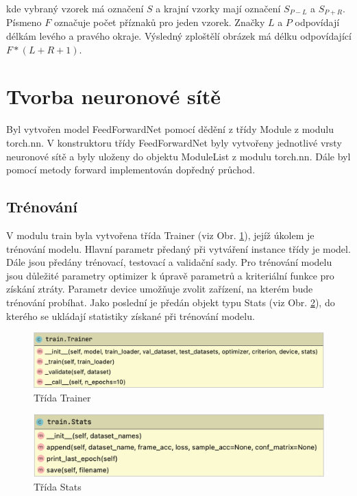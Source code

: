\documentclass[FM,BP]{tulthesis}
\begin{document}
kde vybraný vzorek má označení $ S $ a krajní vzorky mají označení $ S_{P-L} $ a $ S_{P+R} $. Písmeno $ F $ označuje počet příznaků pro jeden vzorek. Značky $ L $ a $ P $ odpovídají délkám levého a pravého okraje. Výsledný zploštělí obrázek má délku odpovídající $ F * (L + R + 1) $.

\section{Tvorba neuronové sítě} %
Byl vytvořen model FeedForwardNet pomocí dědění z třídy Module z modulu torch.nn. V konstruktoru třídy FeedForwardNet byly vytvořeny jednotlivé vrsty neuronové sítě a byly uloženy do objektu ModuleList z modulu torch.nn. Dále byl pomocí metody forward implementován dopředný průchod.

\subsection{Trénování} %
V modulu train byla vytvořena třída Trainer (viz Obr. \ref{fig:trainer}), jejíž úkolem je trénování modelu. Hlavní parametr předaný při vytváření instance třídy je model. Dále jsou předány trénovací, testovací a validační sady. Pro trénování modelu jsou důležité parametry optimizer k úpravě parametrů a kriteriální funkce pro získání ztráty. Parametr device umožňuje zvolit zařízení, na kterém bude trénování probíhat. Jako poslední je předán objekt typu Stats (viz Obr. \ref{fig:stats}), do kterého se ukládají statistiky získané při trénování modelu. 

\begin{figure}[ht]
\centerline{\includegraphics[scale=.3]{train-trainer.png}}
\caption{Třída Trainer}
\label{fig:trainer}
\end{figure}
\FloatBarrier

\begin{figure}[ht]
\centerline{\includegraphics[scale=.33]{train-stats.png}}
\caption{Třída Stats}
\label{fig:stats}
\end{figure}
\FloatBarrier
\end{document}
